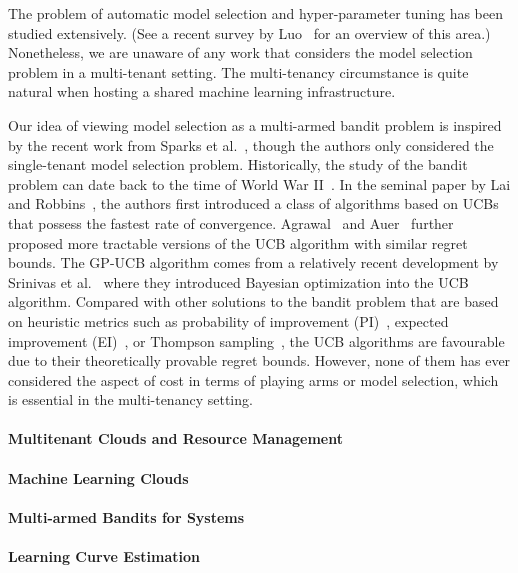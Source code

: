\documentclass[letterpaper]{vldb}
\begin{document}
The problem of automatic model selection and hyper-parameter tuning has been studied extensively. (See a recent survey by Luo~\cite{Luo16} for an overview of this area.)
Nonetheless, we are unaware of any work that considers the model selection problem in a multi-tenant setting.
The multi-tenancy circumstance is quite natural when hosting a shared machine learning infrastructure.

Our idea of viewing model selection as a multi-armed bandit problem is inspired by the recent work from Sparks et al.~\cite{SparksTHFJK15}, though the authors only considered the single-tenant model selection problem.
Historically, the study of the bandit problem can date back to the time of World War II~\cite{Robbins:1952}.
In the seminal paper by Lai and Robbins~\cite{Lai:1985}, the authors first introduced a class of algorithms based on UCBs that possess the fastest rate of convergence.
Agrawal~\cite{Agrawal1995} and Auer~\cite{Auer02,Auer:2002} further proposed more tractable versions of the UCB algorithm with similar regret bounds.
The GP-UCB algorithm comes from a relatively recent development by Srinivas et al.~\cite{SrinivasKKS10} where they introduced Bayesian optimization into the UCB algorithm.
Compared with other solutions to the bandit problem that are based on heuristic metrics such as probability of improvement (PI)~\cite{Kushner1964}, expected improvement (EI)~\cite{SnoekLA12}, or Thompson sampling~\cite{ChapelleL11,KaufmannKM12,Scott:2010},
the UCB algorithms are favourable due to their theoretically provable regret bounds.
However, none of them has ever considered the aspect of cost in terms of playing arms or model selection, which is essential in the multi-tenancy setting.

\paragraph*{Multitenant Clouds and Resource Management}

\paragraph*{Machine Learning Clouds}

\paragraph*{Multi-armed Bandits for Systems}

\paragraph*{Learning Curve Estimation}
\end{document}
